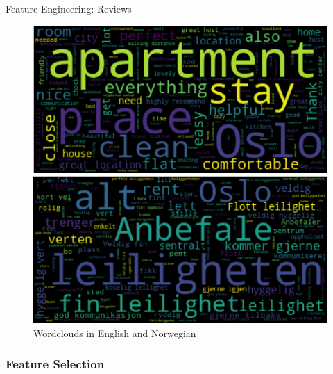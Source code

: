 \documentclass[ngerman,inputenc]{beamer}
\begin{document}
\begin{frame}{Feature Engineering: Reviews}
  
\begin{figure}[t]
\centering
\begin{minipage}{6.7cm}
  \includegraphics[width=\columnwidth]{wordcloud_eng.png}
\end{minipage}
\begin{minipage}{6.7cm}
  \includegraphics[width=\columnwidth]{wordcloud_nor.png}
\end{minipage}
\caption{Wordclouds in English and Norwegian}
\label{fig:wordclouds}
\end{figure}

\end{frame}


\subsubsection{Feature Selection}
\end{document}
